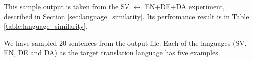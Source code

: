 \documentclass[thesis]{cluu}
\begin{document}
This sample output is taken from the SV $\leftrightarrow$ EN+DE+DA experiment, described in Section \ref{sec:language_similarity}. Its perfromance result is in Table \ref{table:language_similarity}.

We have sampled 20 sentences from the output file. Each of the languages (SV, EN, DE and DA) as the target translation language has five examples.



\printbibliography
\end{document}
